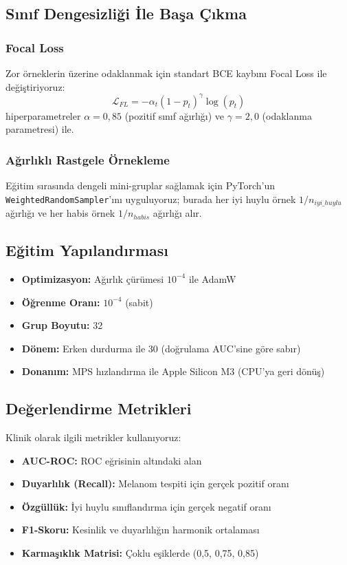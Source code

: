 \documentclass[12pt,a4paper]{article}
\begin{document}
\subsection{Sınıf Dengesizliği İle Başa Çıkma}

\subsubsection{Focal Loss}
Zor örneklerin üzerine odaklanmak için standart BCE kaybını Focal Loss ile değiştiriyoruz:
\begin{equation}
    \mathcal{L}_{FL} = -\alpha_t (1 - p_t)^\gamma \log(p_t)
\end{equation}
hiperparametreler $\alpha=0,85$ (pozitif sınıf ağırlığı) ve $\gamma=2,0$ (odaklanma parametresi) ile.

\subsubsection{Ağırlıklı Rastgele Örnekleme}
Eğitim sırasında dengeli mini-gruplar sağlamak için PyTorch'un \texttt{WeightedRandomSampler}'ını uyguluyoruz; burada her iyi huylu örnek $1/n_{iyi\_huylu}$ ağırlığı ve her habis örnek $1/n_{habis}$ ağırlığı alır.

\subsection{Eğitim Yapılandırması}

\begin{itemize}
    \item \textbf{Optimizasyon:} Ağırlık çürümesi $10^{-4}$ ile AdamW
    \item \textbf{Öğrenme Oranı:} $10^{-4}$ (sabit)
    \item \textbf{Grup Boyutu:} 32
    \item \textbf{Dönem:} Erken durdurma ile 30 (doğrulama AUC'sine göre sabır)
    \item \textbf{Donanım:} MPS hızlandırma ile Apple Silicon M3 (CPU'ya geri dönüş)
\end{itemize}

\subsection{Değerlendirme Metrikleri}

Klinik olarak ilgili metrikler kullanıyoruz:
\begin{itemize}
    \item \textbf{AUC-ROC:} ROC eğrisinin altındaki alan
    \item \textbf{Duyarlılık (Recall):} Melanom tespiti için gerçek pozitif oranı
    \item \textbf{Özgüllük:} İyi huylu sınıflandırma için gerçek negatif oranı
    \item \textbf{F1-Skoru:} Kesinlik ve duyarlılığın harmonik ortalaması
    \item \textbf{Karmaşıklık Matrisi:} Çoklu eşiklerde (0,5, 0,75, 0,85)
\end{itemize}
\end{document}
